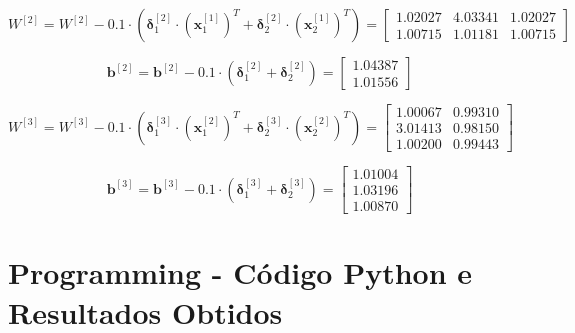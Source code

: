 \documentclass[a4paper,12pt]{article} %
\begin{document}
\begin{enumerate}
\begin{equation*}
    W^{[2]} = W^{[2]} - 0.1 \cdot (\bm{\delta}^{[2]}_1 \cdot (\textbf{x}^{[1]}_1)^T + \bm{\delta}^{[2]}_2 \cdot (\textbf{x}^{[1]}_2)^T) = \begin{bmatrix} 1.02027 & 4.03341 & 1.02027 \\
                                                                                                                            1.00715 & 1.01181 & 1.00715 \end{bmatrix}
\end{equation*}

\begin{equation*}
    \textbf{b}^{[2]} = \textbf{b}^{[2]} - 0.1 \cdot (\bm{\delta}^{[2]}_1 + \bm{\delta}^{[2]}_2) = \begin{bmatrix} 1.04387 \\ 1.01556 \end{bmatrix}
\end{equation*}

\begin{equation*}
    W^{[3]} = W^{[3]} - 0.1 \cdot (\bm{\delta}^{[3]}_1 \cdot (\textbf{x}^{[2]}_1)^T + \bm{\delta}^{[3]}_2 \cdot (\textbf{x}^{[2]}_2)^T) = \begin{bmatrix} 1.00067 & 0.99310 \\
                                                                                                                            3.01413 & 0.98150 \\
                                                                                                                            1.00200 & 0.99443 \end{bmatrix}
\end{equation*}

\begin{equation*}
    \textbf{b}^{[3]} = \textbf{b}^{[3]} - 0.1 \cdot (\bm{\delta}^{[3]}_1 + \bm{\delta}^{[3]}_2) = \begin{bmatrix} 1.01004 \\ 1.03196 \\ 1.00870 \end{bmatrix}
\end{equation*}

\end{enumerate}

\clearpage
\section*{Programming - Código Python e Resultados Obtidos}
\end{document}
